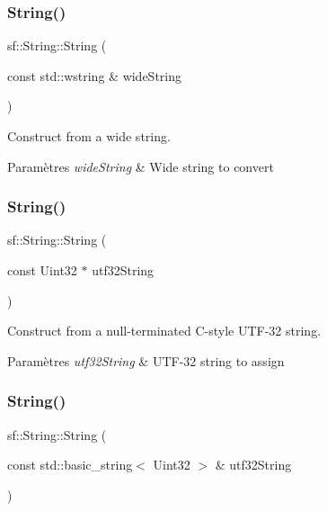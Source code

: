 \subsubsection{\texorpdfstring{String()}{String()}\hspace{0.1cm}{\footnotesize\ttfamily [8/11]}}
{\footnotesize\ttfamily sf\+::\+String\+::\+String (\begin{DoxyParamCaption}\item[{const std\+::wstring \&}]{wide\+String }\end{DoxyParamCaption})}



Construct from a wide string. 


\begin{DoxyParams}{Paramètres}
{\em wide\+String} & Wide string to convert \\
\hline
\end{DoxyParams}
\mbox{\label{classsf_1_1String_aea3629adf19f9fe713d4946f6c75b214}} 
\subsubsection{\texorpdfstring{String()}{String()}\hspace{0.1cm}{\footnotesize\ttfamily [9/11]}}
{\footnotesize\ttfamily sf\+::\+String\+::\+String (\begin{DoxyParamCaption}\item[{const Uint32 $\ast$}]{utf32\+String }\end{DoxyParamCaption})}



Construct from a null-\/terminated C-\/style U\+T\+F-\/32 string. 


\begin{DoxyParams}{Paramètres}
{\em utf32\+String} & U\+T\+F-\/32 string to assign \\
\hline
\end{DoxyParams}
\mbox{\label{classsf_1_1String_a6eee86dbe75d16bbcc26e97416c2e1ca}} 
\subsubsection{\texorpdfstring{String()}{String()}\hspace{0.1cm}{\footnotesize\ttfamily [10/11]}}
{\footnotesize\ttfamily sf\+::\+String\+::\+String (\begin{DoxyParamCaption}\item[{const std\+::basic\+\_\+string$<$ Uint32 $>$ \&}]{utf32\+String }\end{DoxyParamCaption})}



